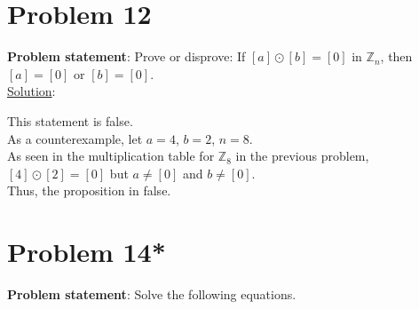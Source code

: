 \documentclass{article} %
\begin{document}
\newpage

\section*{Problem 12}


\textbf{Problem statement}: Prove or disprove: If $[a] \odot [b] = [0]$ in $\mathbb{Z}_n$, then $[a] = [0]$ or $[b] = [0]$.
\\

\underline{Solution}: 
\begin{addmargin}[1em]{0em}
This statement is false.
\\As a counterexample, let $a = 4$, $b = 2$, $n = 8$.
\\As seen in the multiplication table for $\mathbb{Z}_8$ in the previous problem, $[4] \odot [2] = [0]$ but $a \neq [0]$ and $b \neq [0]$.
\\Thus, the proposition in false.
\end{addmargin}

\newpage

\section*{Problem 14*}


\textbf{Problem statement}: Solve the following equations.
\\
\end{document}
